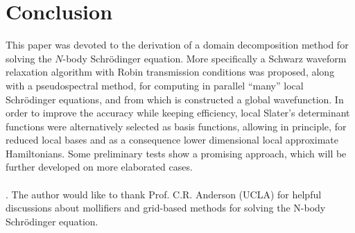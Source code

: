 \section{Conclusion}\label{conclusion}
This paper was devoted to the derivation of a domain decomposition method for solving the $N$-body Schr\"odinger equation. More specifically a Schwarz waveform relaxation algorithm with Robin transmission conditions was proposed, along with a pseudospectral method, for computing in parallel ``many'' local Schr\"odinger equations, and from which is constructed a global wavefunction.  In order to improve the accuracy while keeping efficiency, local Slater's determinant functions were alternatively selected as basis functions, allowing in principle, for reduced local bases and as a consequence lower dimensional local approximate Hamiltonians. Some preliminary tests show a promising approach, which will be further developed on more elaborated cases.
\\
\\
. The author would like to thank Prof. C.R. Anderson (UCLA) for helpful discussions about mollifiers and grid-based methods for solving the N-body Schr\"odinger equation.
